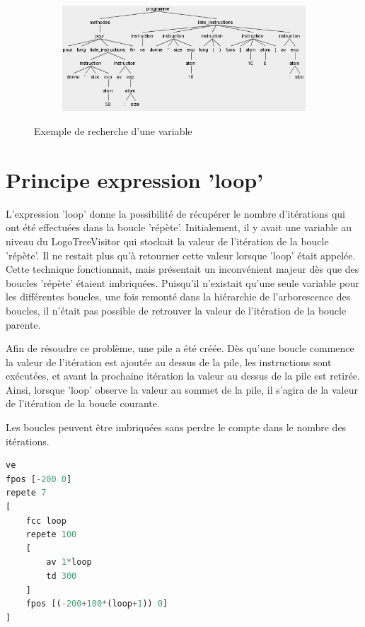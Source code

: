 \documentclass[a4paper,11pt]{article}
\begin{document}
\begin{figure}[!h]
\begin{subfigure}[t]{.15\textwidth}
	\end{subfigure}
	~
	\begin{subfigure}[t]{0.7\textwidth}
		\includegraphics[width=\textwidth]{img/var_tree}
	\end{subfigure}
	\caption{Exemple de recherche d'une variable}
\end{figure}

\section{Principe expression 'loop'}
L'expression 'loop' donne la possibilité de récupérer le nombre d'itérations qui ont été effectuées dans la boucle 'répète'. Initialement, il y avait une variable au niveau du LogoTreeVisitor qui stockait la valeur de l'itération de la boucle 'répète'. Il ne restait plus qu'à retourner cette valeur lorsque 'loop' était appelée. \\
Cette technique fonctionnait, mais présentait un inconvénient majeur dès que des boucles 'répète' étaient imbriquées. Puisqu'il n'existait qu'une seule variable pour les différentes boucles, une fois remonté dans la hiérarchie de l'arborescence des boucles, il n'était pas possible de retrouver la valeur de l'itération de la boucle parente. 

Afin de résoudre ce problème, une pile a été créée. Dès qu'une boucle commence la valeur de l'itération est ajoutée au dessus de la pile, les instructions sont exécutées, et avant la prochaine itération la valeur au dessus de la pile est retirée. Ainsi, lorsque 'loop' observe la valeur au sommet de la pile, il s'agira de la valeur de l'itération de la boucle courante.

Les boucles peuvent être imbriquées sans perdre le compte dans le nombre des itérations. 
\begin{lstlisting}[language=Python]
ve
fpos [-200 0]
repete 7
[
	fcc loop
	repete 100
	[
		av 1*loop
		td 300
	]
	fpos [(-200+100*(loop+1)) 0]	
]
\end{lstlisting}
\end{document}
